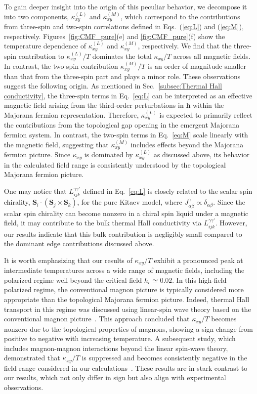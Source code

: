 \documentclass[twocolumn,superscriptaddress,showpacs, longbibliography, aps, prx]{revtex4-2}
\begin{document}
To gain deeper insight into the origin of this peculiar behavior, we decompose it into two components, $\kappa_{xy}^{(L)}$ and  $\kappa_{xy}^{(M)}$, which correspond to the contributions from three-spin and two-spin correlations defined in Eqs.~(\ref{eq:L}) and (\ref{eq:M}), respectively.
Figures~\ref{fig:CMF_pure}(e) and \ref{fig:CMF_pure}(f) show the temperature dependence of $\kappa_{xy}^{(L)}$ and  $\kappa_{xy}^{(M)}$, respectively.
We find that the three-spin contribution to $\kappa_{xy}^{(L)}/T$ dominates the total $\kappa_{xy}/T$ across all magnetic fields.
In contrast, the two-spin contribution $\kappa_{xy}^{(M)}/T$ is an order of magnitude smaller than that from the three-spin part and plays a minor role.
These observations suggest the following origin. 
As mentioned in Sec.~\ref{subsec:Thermal Hall conductivity}, the three-spin terms in Eq.~\eqref{eq:L} can be interpreted as an effective magnetic field arising from the third-order perturbations in $\bm{h}$ within the Majorana fermion representation. 
Therefore, $\kappa_{xy}^{(L)}$ is expected to primarily reflect the contributions from the topological gap opening in the emergent Majorana fermion system.
In contrast, the two-spin terms in Eq.~\eqref{eq:M} scale linearly with the magnetic field, suggesting that $\kappa_{xy}^{(M)}$ includes effects beyond the Majorana fermion picture.
Since $\kappa_{xy}$ is dominated by $\kappa_{xy}^{(L)}$ as discussed above, its behavior in the calculated field range is consistently understood by the topological Majorana fermion picture.

One may notice that $L_{ijk}^{\gamma\gamma'}$ defined in Eq.~\eqref{eq:L} is closely related to 
the scalar spin chirality, $\bm{S}_i\cdot (\bm{S}_j \times \bm{S}_k)$, for the pure Kitaev model, where $J^\gamma_{\alpha\beta} \propto \delta_{\alpha\beta}$. 
Since the scalar spin chirality can become nonzero in a chiral spin liquid under a magnetic field, it may contribute to the bulk thermal Hall conductivity via $L_{ijk}^{\gamma\gamma'}$.
However, our results indicate that this bulk contribution is negligibly small compared to the dominant edge contributions discussed above. 

It is worth emphasizing that our results of $\kappa_{xy}/T$ exhibit a pronounced peak at intermediate temperatures across a wide range of magnetic fields, including the polarized regime well beyond the critical field $h_c \simeq 0.02$. 
In this high-field polarized regime, the conventional magnon picture is typically considered more appropriate than the topological Majorana fermion picture. 
Indeed, thermal Hall transport in this regime was discussed using linear-spin wave theory based on the conventional magnon picture~\cite{McClartyDGRPMP2018}. 
This approach concluded that $\kappa_{xy}/T$ becomes nonzero due to the topological properties of magnons, showing a sign change from positive to negative with increasing temperature. 
A subsequent study, which includes magnon-magnon interactions beyond the linear spin-wave theory, demonstrated that $\kappa_{xy}/T$ is suppressed and becomes consistently negative in the field range considered in our calculations~\cite{Koyama2024}. 
These results are in stark contrast to our results, which not only differ in sign but also align with experimental observations. 
\end{document}
